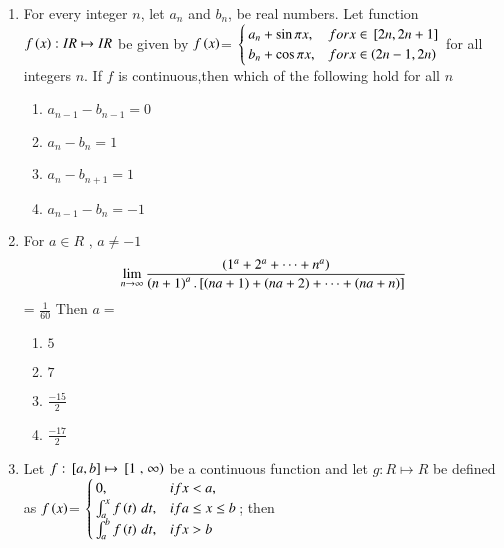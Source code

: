 \documentclass[journal,12pt]{IEEEtran}
\theoremstyle{remark}
\begin{document}
\begin{enumerate}
    \item 
    For every integer $n$, let $a_n$ and $b_n$, be real numbers. Let function $f\left(x\right): IR \mapsto IR$ be given by
    $f\left(x\right)$= 
    $\begin{cases}
       a_n+\sin\pi x, & for x\in {}\left[2n,2n+1\right] \\
       b_n+\cos\pi x, & for x\in \left(2n-1,2n\right)
    \end{cases}$
    for all integers $n$. If $f$ is continuous,then which of the following hold for all $n$ 

    \hfill 
    {}
    
    \begin{enumerate}
        
        \item $a_{n-1}-b_{n-1}=0$ 
        \item $a_n-b_n=1$ 
        \item $a_n-b_{n+1}=1$ 
        \item $a_{n-1}-b_n=-1$ 
    \end{enumerate}


    \item 
	    For $a\in R$ , $a\neq -1$ 
    \begin{align*}
	    \lim_{n\to\infty}\frac{\left(1^a+2^a+\cdots+n^a\right)}{\left(n+1\right)^a.{}\left[\left(na+1\right)+\left(na+2\right)+\cdots+\left(na+n\right)\right]}
    \end{align*} = $\frac{1}{60}$ Then $a=$

    \hfill 
    {}
    
    \begin{multicols}{4}
    \begin{enumerate}
        
        \item $5$
        \item $7$ 
        \item $\frac{-15}{2}$ 
        \item $\frac{-17}{2}$ 
    \end{enumerate}
    \end{multicols}


    \item 
    Let $f: {}\left[a,b\right]\mapsto {}\left[1\right.,\left.\infty\right)$ be a continuous function and let $g: R\mapsto R$ be defined as 
    $f\left(x\right)$= 
    $\begin{cases}
       0, & if x<a, \\
       \int_{a}^{x}{f\left(t\right) \, dt}, & if a\leq x\leq b \\
       \int_{a}^{b}{f\left(t\right) \, dt}, & if x>b
    \end{cases}$; then 


\end{enumerate}
\end{document}

